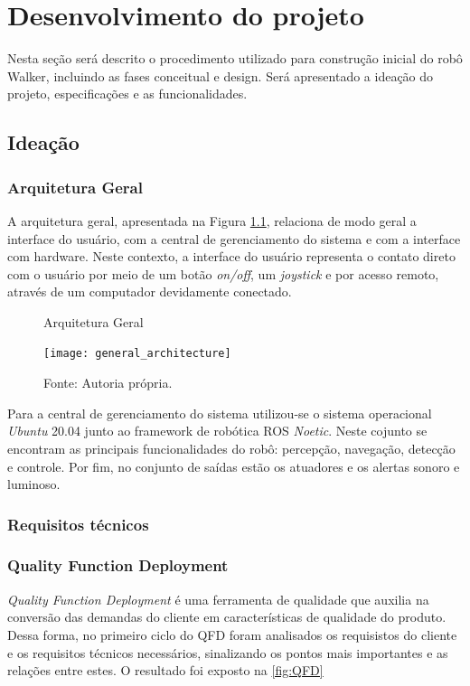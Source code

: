 \chapter{Desenvolvimento do projeto}
\label{chap:metod}
Nesta seção será descrito o procedimento utilizado para construção inicial do robô Walker, incluindo as fases conceitual e design.  Será apresentado a ideação do projeto, especificações e as funcionalidades.

\section{Ideação}

\subsection{Arquitetura Geral}
 A arquitetura geral, apresentada na Figura \ref{fig:Arquitetura geral}, relaciona de modo geral a interface do usuário, com a central de gerenciamento do sistema e com a interface com hardware. Neste contexto, a interface do usuário representa o contato direto com o usuário por meio de um botão \textit{on/off}, um \textit{joystick} e por acesso remoto, através de um computador devidamente conectado.

 \begin{figure} [h!]	
    \centering

    \caption{Arquitetura Geral}
    \texttt{[image: general\_architecture]}
    \caption*{Fonte: Autoria própria.}
    \label{fig:Arquitetura geral}
\end{figure}	

Para a central de gerenciamento do sistema utilizou-se o sistema operacional \textit{Ubuntu} 20.04 junto ao framework de robótica ROS \textit{Noetic}. Neste cojunto se encontram as principais funcionalidades do robô: percepção, navegação, detecção e controle. Por fim, no conjunto de saídas estão os atuadores e os alertas sonoro e luminoso.

\subsection{Requisitos técnicos}

\subsection{Quality Function Deployment}
\textit{Quality Function Deployment} é uma ferramenta de qualidade que auxilia na conversão das demandas do cliente em características de qualidade do produto. Dessa forma, no primeiro ciclo do QFD foram analisados os requisistos do cliente e os requisitos técnicos necessários, sinalizando os pontos mais importantes e as relações entre estes. O resultado foi exposto na \ref{fig:QFD}

